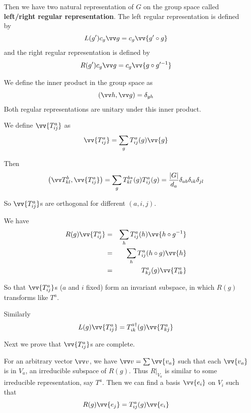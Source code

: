 \documentclass[12pt]{book}
\begin{document}
	\begin{example}
		
	Then we have two natural representation of $G$ on the group space called \textbf{left/right regular representation}. The left regular representation is defined by
	\begin{equation}
		L(g')c_g\vv g=c_g\vv{g'\circ g}
	\end{equation}
	and the right regular representation is defined by
	\begin{equation}
		R(g')c_g\vv g=c_g\vv{g\circ g'^{-1}} 
	\end{equation}
	
	We define the inner product in the group space as
	\begin{equation}
	(\vv h,\vv g)=\delta_{gh}
	\end{equation}
	Both regular representations are unitary under this inner product.
	
	We define $\vv{T^a_{ij}}$ as 
	\begin{equation}
		\vv{T^a_{ij}}=\sum_gT^a_{ij}(g)\vv{g}
	\end{equation}
	
	Then
	\begin{equation}
		\big(\vv T^b_{kl},\vv{T^a_{ij}}\big)=\sum_gT^{b*}_{kl}(g)T^a_{ij}(g)=\frac{|G|}{d_a}\delta_{ab}\delta_{ik}\delta_{jl}
	\end{equation}
	
	So $\vv{T^a_{ij}}$s are orthogonal for different $(a,i,j)$.
	
	We have
	\begin{eqnarray}
		R(g)\vv{T^a_{ij}}&=&\sum_hT^a_{ij}(h)\vv{h\circ g^{-1}}\\
		&=&\sum_hT^a_{ij}(h\circ g)\vv{h}\\
		&=&T^a_{kj}(g)\vv{T^a_{ik}}
	\end{eqnarray}
	
	So that $\vv{T^a_{ij}}$s ($a$ and $i$ fixed) form an invariant subspace, in which $R(g)$ transforms like $T^a$.
	
	Similarly
	\begin{equation}
		L(g)\vv{T^a_{ij}}=T^{a\dagger}_{ik}(g)\vv{T^a_{kj}}
	\end{equation}
	
	Next we prove that $\vv{T^a_{ij}}$s are complete. 
	
	For an arbitrary vector $\vv v$, we have $\vv v=\sum \vv{v_a}$ such that each $\vv{v_a}$ is in $V_a$, an irreducible subspace of $R(g)$. Thus $R|_{V_a}$ is similar to some irreducible representation, say $T^a$. Then we can find a basis $\vv{e_i}$ on $V_i$ such that
	\begin{equation}
		R(g)\vv{e_j}=T^a_{ij}(g)\vv{e_i}
	\end{equation}
	

\end{example}
\end{document}
